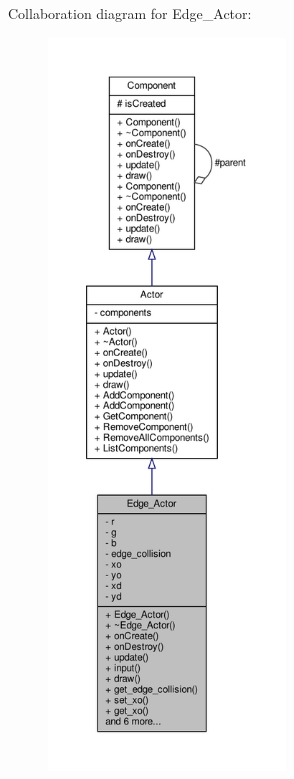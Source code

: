 Collaboration diagram for Edge\+\_\+\+Actor\+:
\nopagebreak
\begin{figure}[H]
\begin{center}
\leavevmode
\includegraphics[height=550pt]{classEdge__Actor__coll__graph}
\end{center}
\end{figure}
